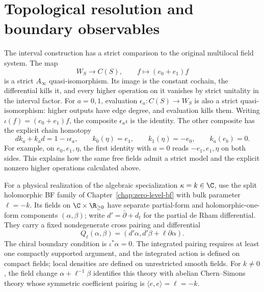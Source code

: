 \clearpage
\section{Topological resolution and boundary observables}

The interval construction has a strict comparison to the original
multilocal field system.  The map
\[
 W_S\longrightarrow C(S),\qquad f\longmapsto(e_0+e_1)f
\]
is a strict $A_\infty$ quasi-isomorphism.  Its image is the constant
cochain, the differential kills it, and every higher operation on it
vanishes by strict unitality in the interval factor.  For $a=0,1$, evaluation $\epsilon_a:C(S)\to W_S$ is also a strict
quasi-isomorphism: higher outputs have edge degree, and evaluation kills them.
Writing $\iota(f)=(e_0+e_1)f$, the composite $\epsilon_a\iota$ is the
identity.  The other composite has the explicit chain homotopy
\[
 dk_a+k_ad=1-\iota\epsilon_a,\qquad
 k_0(\eta)=e_1,\qquad k_1(\eta)=-e_0,\qquad k_a(e_b)=0.
\]
For example, on $e_0,e_1,\eta$, the first identity with $a=0$
reads $-e_1,e_1,\eta$ on both sides.  This explains
how the same free fields admit a strict model and the explicit nonzero
higher operations calculated above.

For a physical realization of the algebraic specialization
$\kappa=k\in\C$, use the split holomorphic BF family of
Chapter~\ref{chap:zero-level-bf} with bulk parameter $\ell=-k$.
Its fields on $\C\times\R_{\ge0}$ have separate partial-form and
holomorphic-one-form components $(\alpha,\beta)$; write
$d'=\bar\partial+d_t$ for the partial de Rham differential.
They carry a fixed
nondegenerate cross pairing and differential
\[
 Q_\ell(\alpha,\beta)=(d'\alpha,d'\beta+\ell\partial\alpha).
\]
The chiral boundary condition is $\iota^*\alpha=0$.  The integrated
pairing requires at least one compactly supported argument, and the
integrated action is defined on compact fields; local densities are
defined on unrestricted smooth fields.
For $k\ne0$, the field change
$\alpha+\ell^{-1}\beta$ identifies this theory with abelian
Chern--Simons theory whose symmetric coefficient pairing is
$\langle e,e\rangle=\ell=-k$.

